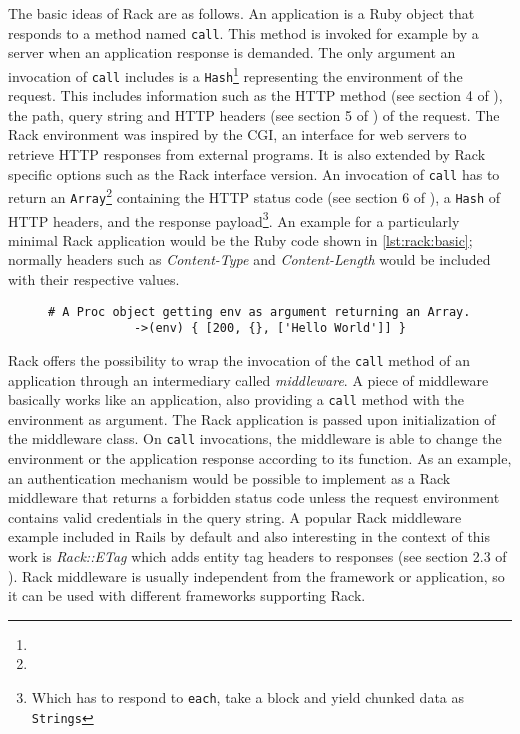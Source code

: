 
	The basic ideas of Rack are as follows. An application is a Ruby object
	that responds to a method named \texttt{call}. This method is invoked for
	example by a server when an application response is demanded. The only
	argument an invocation of \texttt{call} includes is a
	\texttt{Hash}\footnote{\urlRubyHash} representing the environment of the
	request. This includes information such as the \ac{HTTP} method (see
	section 4 of \cite{http-1}), the path, query string and \ac{HTTP}
	headers (see section 5 of \cite{http-1}) of the request. The Rack
	environment was inspired by the \ac{CGI}, an interface for web servers to
	retrieve \ac{HTTP} responses from external programs. It is also extended
	by Rack specific options such as the Rack interface version. An invocation
	of \texttt{call} has to return an \texttt{Array}\footnote{\urlRubyArray}
	containing the \ac{HTTP} status code (see section 6 of \cite{http-1}), a
	\texttt{Hash} of \ac{HTTP} headers, and the response payload\footnote{Which
	has to respond to \texttt{each}, take a block and yield chunked data as
	\texttt{Strings}}. An example for a particularly minimal Rack application
	would be the Ruby code shown in \autoref{lst:rack:basic}; normally headers
	such as \emph{Content-Type} and \emph{Content-Length} would be included
	with their respective values.

	\begin{figure}[H]
		\begin{lstlisting}[gobble=6,caption={Minimal Rack application},label=lst:rack:basic]
			# A Proc object getting env as argument returning an Array.
			->(env) { [200, {}, ['Hello World']] }
		\end{lstlisting}
	\end{figure}

	Rack offers the possibility to wrap the invocation of the \texttt{call}
	method of an application through an intermediary called \emph{middleware}.
	A piece of middleware basically works like an application, also providing a
	\texttt{call} method with the environment as argument. The Rack application
	is passed upon initialization of the middleware class. On \texttt{call}
	invocations, the middleware is able to change the environment or the
	application response according to its function. As an example, an
	authentication mechanism would be possible to implement as a Rack
	middleware that returns a forbidden status code unless the request
	environment contains valid credentials in the query string. A popular Rack
	middleware example included in \ac{Rails} by default and also interesting
	in the context of this work is \emph{Rack::ETag} which adds entity tag
	headers to responses (see section 2.3 of \cite{http-2}). Rack middleware is
	usually independent from the framework or application, so it can be used
	with different frameworks supporting Rack.

